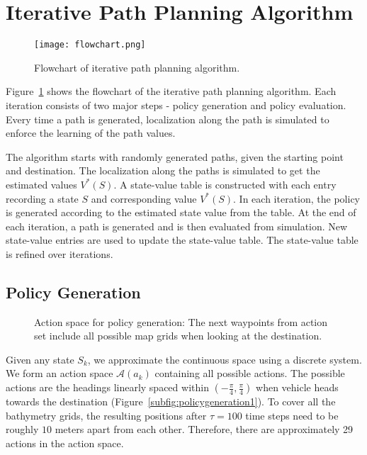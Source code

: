 \section{Iterative Path Planning Algorithm}
\label{sec:IPPA}
\begin{figure}[htbp]
\centering
\texttt{[image: flowchart.png]}
\caption{Flowchart of iterative path planning algorithm.}
\label{fig:flowchart}
\end{figure}

Figure~\ref{fig:flowchart} shows the flowchart of the iterative path planning algorithm. Each iteration consists of two major steps - policy generation and policy evaluation. Every time a path is generated, localization along the path is simulated to enforce the learning of the path values.

The algorithm starts with randomly generated paths, given the starting point and destination. The localization along the paths is simulated to get the estimated values $V^*(S)$. A state-value table is constructed with each entry recording a state $S$ and corresponding value $V^*(S)$. In each iteration, the policy is generated according to the estimated state value from the table. At the end of each iteration, a path is generated and is then evaluated from simulation. New state-value entries are used to update the state-value table. The state-value table is refined over iterations.

\subsection{Policy Generation}

\begin{figure}[htpb]
\begin{center}
\caption{Action space for policy generation: The next waypoints from action set include all possible map grids when looking at the destination.}
\label{fig:policygeneration}
\end{center}
\end{figure}

Given any state $S_k$, we approximate the continuous space using a discrete system. We form an action space $\mathcal{A}(a_k)$ containing all possible actions. The possible actions are the headings linearly spaced within $(-\frac{\pi}{4},\frac{\pi}{4})$ when vehicle heads towards the destination (Figure~\ref{subfig:policygeneration1}). To cover all the bathymetry grids, the resulting positions after $\tau=100$ time steps need to be roughly $10$ meters apart from each other. Therefore, there are approximately 29 actions in the action space. 

